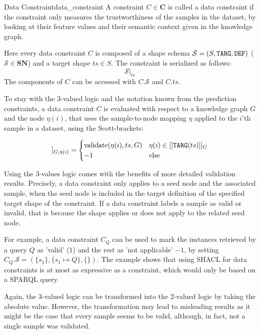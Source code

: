 \begin{Def}{Data Constraint}{data_constraint}
A constraint $C \in \mathbf{C}$ is called a data constraint if the constraint only measures the trustworthiness of the samples in the dataset, by looking at their feature values and their semantic context given in the knowledge graph.

Here every data constraint $C$ is composed of a shape schema $\mathcal{S} = (S, \texttt{TARG}, \texttt{DEF})$ ($\mathcal{S} \in \mathbf{SN}$) and a target shape $ts \in S$. The constraint is serialized as follows:
\[\mathcal{S}\big|_{ts}\] 
The components of $C$ can be accessed with $C.\mathcal{S}$ and $C.ts$.
\end{Def}

To stay with the 3-valued logic and the notation known from the prediction constraints, a data constraint $C$ is evaluated with respect to a knowledge graph $G$ and the node $\eta(i)$, that uses the sample-to-node mapping $\eta$ applied to the $i$'th sample in a dataset, using the Scott-brackets:

\begin{gather}
    [[C_d]]_{G,\eta(i)} = \begin{cases} \text{validate}(\eta(i),ts,G) & \eta(i) \in [[\uri{TARG}(ts)]]_G\\ -1 & \text{else}
    \label{F:constraint_data} \end{cases}
\end{gather}

Using the 3-values logic comes with the benefits of more detailed validation results. Precisely, a data constraint only applies to a seed node and the associated sample, when the seed node is included in the target definition of the specified target shape of the constraint. If a data constraint labels a sample as valid or invalid, that is because the shape applies or does not apply to the related seed node.

For example, a data constraint $C_{Q}$ can be used to mark the instances retrieved by a query $Q$ as 'valid' ($1$) and the rest as 'not applicable' $-1$, by setting $C_{Q}.\mathcal{S} = (\{s_1\}, \{s_1 \mapsto Q\},\{\})$.
The example shows that using SHACL for data constraints is at most as expressive as a constraint, which would only be based on a SPARQL query.

Again, the 3-valued logic can be transformed into the 2-valued logic by taking the absolute value. However, the transformation may lead to misleading results as it might be the case that every sample seems to be valid, although, in fact, not a single sample was validated.

